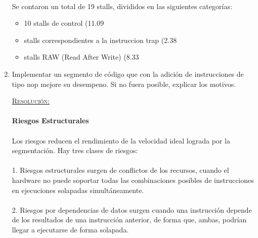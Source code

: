 \documentclass[a4paper,11pt]{article}
\begin{document}
\begin{enumerate}
\paragraph{} 

Se contaron un total de 19 stalls, divididos en las siguientes categor\'ias:

\begin{itemize}
 \item 10 stalls de control (11.09%
 \item  stalls correspondientes a la instruccion trap (2.38%
 \item stalls RAW (Read After Write) (8.33%
\end{itemize}

\newpage

\item Implementar un segmento de c\'odigo que con la adici\'on de instrucciones de tipo nop mejore su desempeno. Si no fuera posible, explicar los motivos.

\underline{\textsc{Resoluci\'on:}}

\paragraph{Riesgos Estructurales}

\paragraph{}
Los riesgos reducen el rendimiento de la velocidad ideal lograda por la segmentaci\'on. Hay tres clases de riesgos:
\paragraph{}
1. Riesgos estructurales surgen de conflictos de los recursos, cuando el hardware no puede soportar todas las combinaciones posibles de instrucciones en ejecuciones solapadas simult\'aneamente.
\paragraph{}
2. Riesgos por dependencias de datos surgen cuando una instrucci\'on depende de los resultados de una instrucci\'on anterior, de forma que, ambas, podr\'ian llegar a ejecutarse de forma solapada.

\end{enumerate}
\end{document}
